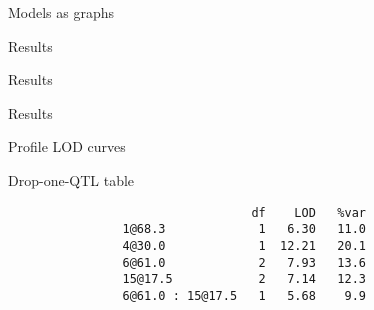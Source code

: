 \documentclass[aspectratio=169,12pt,t]{beamer}
\begin{document}
\begin{frame}[c]{Models as graphs}


\end{frame}





\begin{frame}[c]{Results}




\end{frame}

\addtocounter{page}{-1}

\begin{frame}{Results}

\vfill





\end{frame}

\addtocounter{page}{-1}

\begin{frame}{Results}

\vfill




\end{frame}

\begin{frame}{Profile LOD curves}

\vfill




\end{frame}









\begin{frame}[fragile]{Drop-one-QTL table}


\vspace{40mm}


\begin{verbatim}
                                  df    LOD   %var
                1@68.3             1   6.30   11.0
                4@30.0             1  12.21   20.1
                6@61.0             2   7.93   13.6
                15@17.5            2   7.14   12.3
                6@61.0 : 15@17.5   1   5.68    9.9
\end{verbatim}

\end{frame}
\end{document}
